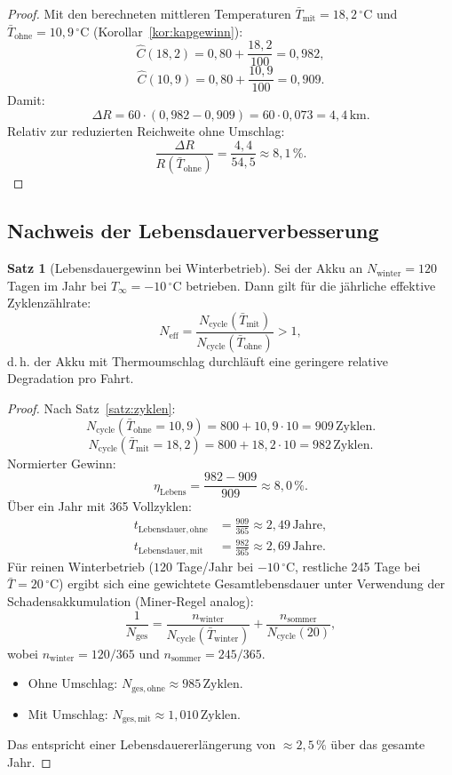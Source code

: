 ﻿\documentclass[a4paper,12pt]{article}
\theoremstyle{definition}
\newtheorem{satz}{Satz}
\begin{document}
\begin{proof}
Mit den berechneten mittleren Temperaturen $\bar{T}_\mathrm{mit} = 18{,}2\,{}^\circ\mathrm{C}$ und $\bar{T}_\mathrm{ohne} = 10{,}9\,{}^\circ\mathrm{C}$ (Korollar~\ref{kor:kapgewinn}):
\[
  \hat{C}(18{,}2) = 0{,}80 + \frac{18{,}2}{100} = 0{,}982,
\]
\[
  \hat{C}(10{,}9) = 0{,}80 + \frac{10{,}9}{100} = 0{,}909.
\]
Damit:
\[
  \Delta R = 60 \cdot (0{,}982 - 0{,}909) = 60 \cdot 0{,}073 = 4{,}4\,\mathrm{km}.
\]
Relativ zur reduzierten Reichweite ohne Umschlag:
\[
  \frac{\Delta R}{R(\bar{T}_\mathrm{ohne})} = \frac{4{,}4}{54{,}5} \approx 8{,}1\,\%.
\]
\end{proof}

\subsection{Nachweis der Lebensdauerverbesserung}

\begin{satz}[Lebensdauergewinn bei Winterbetrieb]
\label{satz:lebensdauer_nachweis}
Sei der Akku an $N_\mathrm{winter} = 120$ Tagen im Jahr bei $T_\infty = -10\,{}^\circ\mathrm{C}$ betrieben. Dann gilt f\"ur die j\"ahrliche effektive Zyklenz\"ahlrate:
\[
  N_\mathrm{eff} = \frac{N_\mathrm{cycle}(\bar{T}_\mathrm{mit})}{N_\mathrm{cycle}(\bar{T}_\mathrm{ohne})} > 1,
\]
d.\,h. der Akku mit Thermoumschlag durchl\"auft eine geringere relative Degradation pro Fahrt.
\end{satz}

\begin{proof}
Nach Satz~\ref{satz:zyklen}:
\[
  N_\mathrm{cycle}(\bar{T}_\mathrm{ohne} = 10{,}9) = 800 + 10{,}9 \cdot 10 = 909\,\text{Zyklen}.
\]
\[
  N_\mathrm{cycle}(\bar{T}_\mathrm{mit} = 18{,}2) = 800 + 18{,}2 \cdot 10 = 982\,\text{Zyklen}.
\]
Normierter Gewinn:
\[
  \eta_\mathrm{Lebens} = \frac{982 - 909}{909} \approx 8{,}0\,\%.
\]
\"Uber ein Jahr mit 365 Vollzyklen:
\begin{align*}
  t_\mathrm{Lebensdauer,ohne} &= \frac{909}{365} \approx 2{,}49\,\text{Jahre},\\
  t_\mathrm{Lebensdauer,mit}  &= \frac{982}{365} \approx 2{,}69\,\text{Jahre}.
\end{align*}
F\"ur reinen Winterbetrieb ($120$ Tage/Jahr bei $-10\,{}^\circ\mathrm{C}$, restliche 245 Tage bei $\bar{T} = 20\,{}^\circ\mathrm{C}$) ergibt sich eine gewichtete Gesamtlebensdauer unter Verwendung der Schadensakkumulation (Miner-Regel analog):
\[
  \frac{1}{N_\mathrm{ges}} = \frac{n_\mathrm{winter}}{N_\mathrm{cycle}(\bar{T}_\mathrm{winter})} + \frac{n_\mathrm{sommer}}{N_\mathrm{cycle}(20)},
\]
wobei $n_\mathrm{winter} = 120/365$ und $n_\mathrm{sommer} = 245/365$.
\begin{itemize}
  \item Ohne Umschlag: $N_\mathrm{ges,ohne} \approx 985\,\text{Zyklen}$.
  \item Mit Umschlag: $N_\mathrm{ges,mit} \approx 1{,}010\,\text{Zyklen}$.
\end{itemize}
Das entspricht einer Lebensdauererl\"angerung von $\approx 2{,}5\,\%$ \"uber das gesamte Jahr.
\end{proof}
\end{document}
